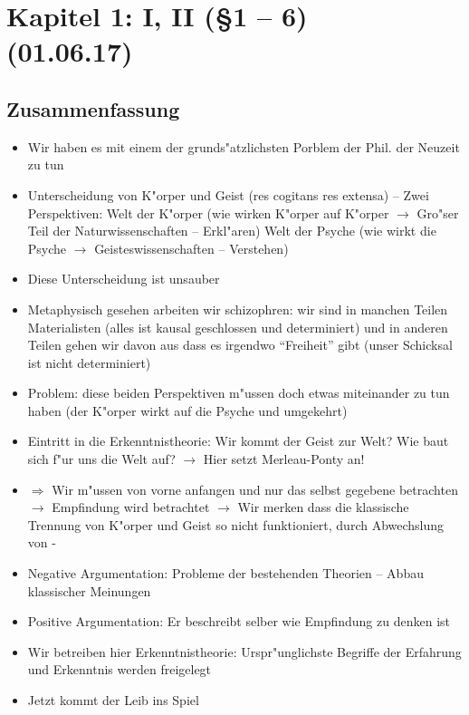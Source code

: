 \documentclass[emulatestandardclasses]{scrartcl}
\begin{document}
\section{Kapitel 1: I, II (\S 1 -- 6)\\(01.06.17)}

\subsection{Zusammenfassung}

\begin{itemize}
  \item Wir haben es mit einem der grunds"atzlichsten Porblem der Phil. der Neuzeit zu tun
  \item Unterscheidung von K"orper und Geist (res cogitans res extensa) -- Zwei Perspektiven: Welt der K"orper (wie wirken K"orper auf K"orper $\rightarrow$ Gro"ser Teil der Naturwissenschaften -- Erkl"aren) Welt der Psyche (wie wirkt die Psyche $\rightarrow$ Geisteswissenschaften -- Verstehen)
  \item Diese Unterscheidung ist unsauber
  \item Metaphysisch gesehen arbeiten wir schizophren: wir sind in manchen Teilen Materialisten (alles ist kausal geschlossen und determiniert) und in anderen Teilen gehen wir davon aus dass es irgendwo "`Freiheit"' gibt (unser Schicksal ist nicht determiniert)
  \item Problem: diese beiden Perspektiven m"ussen doch etwas miteinander zu tun haben (der K"orper wirkt auf die Psyche und umgekehrt)
  \item Eintritt in die Erkenntnistheorie: Wir kommt der Geist zur Welt? Wie baut sich f"ur uns die Welt auf? $\rightarrow$ Hier setzt Merleau-Ponty an!
  \item $\Rightarrow$ Wir m"ussen von vorne anfangen und nur das selbst gegebene betrachten $\rightarrow$ Empfindung wird betrachtet $\rightarrow$ Wir merken dass die klassische Trennung von K"orper und Geist so nicht funktioniert, durch Abwechslung von -
  \item Negative Argumentation: Probleme der bestehenden Theorien -- Abbau klassischer Meinungen
  \item Positive Argumentation: Er beschreibt selber wie Empfindung zu denken ist
  \item Wir betreiben hier Erkenntnistheorie: Urspr"unglichste Begriffe der Erfahrung und Erkenntnis werden freigelegt
  \item Jetzt kommt der Leib ins Spiel
\end{itemize}
\end{document}
